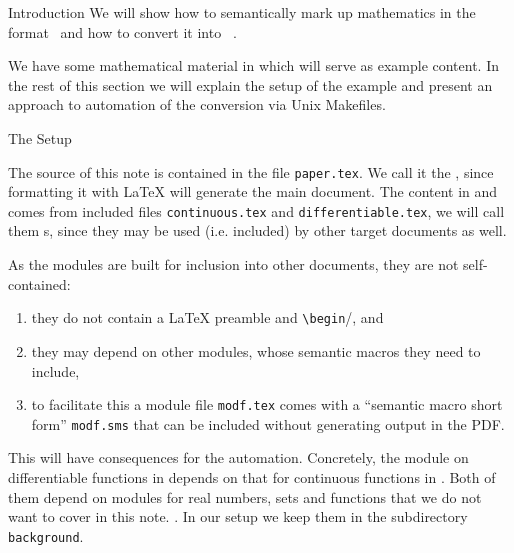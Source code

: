 \begin{omgroup}[id=intro]{Introduction}
  We will show how to semantically mark up mathematics in the {\sTeX}
  format~\cite{Kohlhase:ulsmf08} and how to convert it into
  {\omdoc}~\cite{Kohlhase:OMDoc1.3}.

  We have some mathematical material in {} which will serve as example
  content. In the rest of this section we will explain the setup of the example and
  present an approach to automation of the {\omdoc} conversion via Unix Makefiles.
  \begin{omgroup}{The Setup}
    \begin{module}[id=setup]
    \begin{definition}[display=flow]
      The source of this note is contained in the file {\texttt{paper.tex}}. We call it
     the {}, since formatting it with {\LaTeX} will generate the main
      document. The content in {} and {}
      comes from included files {\texttt{continuous.tex}} and
     {\texttt{differentiable.tex}}, we will call them {s}, since they may
      be used (i.e. included) by other target documents as well.
    \end{definition}

    \begin{omtext}
      As the modules are built for inclusion into other documents, they are not
      self-contained:
    \begin{enumerate}
    \item they do not contain a {\LaTeX} preamble and
      \verb|\begin|/\verb||, and
    \item they may depend on other modules, whose semantic macros they need to include,
    \item to facilitate this a module file {\texttt{modf.tex}} comes with a ``semantic
      macro short form'' {\texttt{modf.sms}} that can be included without generating
      output in the PDF.
    \end{enumerate}
  \end{omtext}
  
  \begin{omtext}
    This will have consequences for the automation. Concretely, the module on
    differentiable functions in {} depends on that for continuous
    functions in {}. Both of them depend on modules for real numbers,
    sets and functions that we do not want to cover in this note. . In our setup we
    keep them in the subdirectory {\texttt{background}}.
  \end{omtext}
\end{module}
\end{omgroup}


\end{omgroup}
